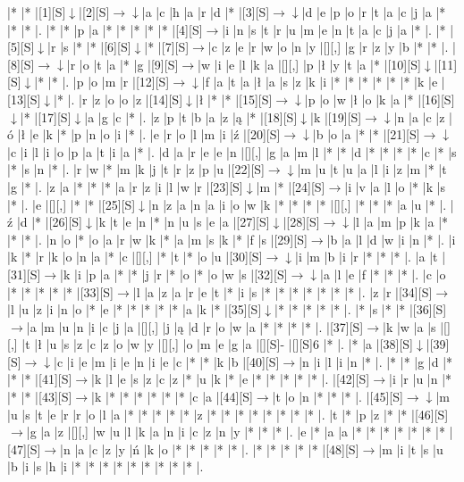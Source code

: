 \documentclass[11pt]{article}
\newcommand\drarr{$\rightarrow \!\!\!\!\! \downarrow$}
\newcommand\rarr{$\rightarrow$}
\newcommand\darr{$\downarrow$}
\begin{document}
\noindent\begin{Puzzle}{24}{26}|*	|*	|[1][S]\darr	|[2][S]\drarr	|a	|c	|h	|a	|r	|d	|*	|[3][S]\drarr	|d	|e	|p	|o	|r	|t	|a	|c	|j	|a	|*	|*	|*	|.
|*	|*	|p	|a	|*	|*	|*	|*	|*	|[4][S]\rarr	|i	|n	|s	|t	|r	|u	|m	|e	|n	|t	|a	|c	|j	|a	|*	|.
|*	|[5][S]\darr	|r	|s	|*	|*	|[6][S]\darr	|*	|[7][S]\rarr	|c	|z	|e	|r	|w	|o	|n	|y	|[][,]{ }	|g	|r	|z	|y	|b	|*	|*	|.
|[8][S]\drarr	|r	|o	|t	|a	|*	|g	|[9][S]\rarr	|w	|i	|e	|l	|k	|a	|[][,]{ }	|p	|ł	|y	|t	|a	|*	|[10][S]\darr	|[11][S]\darr	|*	|*	|.
|p	|o	|m	|r	|[12][S]\drarr	|f	|a	|t	|a	|ł	|a	|s	|z	|k	|i	|*	|*	|*	|*	|*	|*	|k	|e	|[13][S]\darr	|*	|.
|r	|z	|o	|o	|z	|[14][S]\darr	|ł	|*	|*	|[15][S]\drarr	|p	|o	|w	|ł	|o	|k	|a	|*	|[16][S]\darr	|*	|[17][S]\darr	|a	|g	|c	|*	|.
|z	|p	|t	|b	|a	|z	|ą	|*	|[18][S]\darr	|k	|[19][S]\drarr	|n	|a	|c	|z	|ó	|ł	|e	|k	|*	|p	|n	|o	|i	|*	|.
|e	|r	|o	|l	|m	|i	|ź	|[20][S]\drarr	|b	|o	|a	|*	|*	|[21][S]\drarr	|c	|i	|l	|i	|o	|p	|a	|t	|i	|a	|*	|.
|d	|a	|r	|e	|e	|n	|[][,]{ }	|g	|a	|m	|l	|*	|*	|d	|*	|*	|*	|*	|c	|*	|s	|*	|s	|n	|*	|.
|r	|w	|*	|m	|k	|j	|t	|r	|z	|p	|u	|[22][S]\drarr	|m	|u	|t	|u	|a	|l	|i	|z	|m	|*	|t	|g	|*	|.
|z	|a	|*	|*	|*	|a	|r	|z	|i	|l	|w	|r	|[23][S]\darr	|m	|*	|[24][S]\rarr	|i	|v	|a	|l	|o	|*	|k	|s	|*	|.
|e	|[][,]{ }	|*	|*	|[25][S]\darr	|n	|z	|a	|n	|a	|i	|o	|w	|k	|*	|*	|*	|*	|[][,]{ }	|*	|*	|*	|a	|u	|*	|.
|ź	|d	|*	|[26][S]\darr	|k	|t	|e	|n	|*	|n	|u	|s	|e	|a	|[27][S]\darr	|[28][S]\drarr	|l	|a	|m	|p	|k	|a	|*	|*	|*	|.
|n	|o	|*	|o	|a	|r	|w	|k	|*	|a	|m	|s	|k	|*	|f	|s	|[29][S]\rarr	|b	|a	|l	|d	|w	|i	|n	|*	|.
|i	|k	|*	|r	|k	|o	|n	|a	|*	|c	|[][,]{ }	|*	|t	|*	|o	|u	|[30][S]\drarr	|i	|m	|b	|i	|r	|*	|*	|*	|.
|a	|t	|[31][S]\rarr	|k	|i	|p	|a	|*	|*	|j	|r	|*	|o	|*	|o	|w	|s	|[32][S]\drarr	|a	|l	|e	|f	|*	|*	|*	|.
|c	|o	|*	|*	|*	|*	|*	|[33][S]\rarr	|l	|a	|z	|a	|r	|e	|t	|*	|i	|s	|*	|*	|*	|*	|*	|*	|*	|.
|z	|r	|[34][S]\rarr	|l	|u	|z	|i	|n	|o	|*	|e	|*	|*	|*	|*	|*	|a	|k	|*	|[35][S]\darr	|*	|*	|*	|*	|*	|.
|*	|s	|*	|*	|[36][S]\rarr	|a	|m	|u	|n	|i	|c	|j	|a	|[][,]{ }	|j	|ą	|d	|r	|o	|w	|a	|*	|*	|*	|*	|.
|[37][S]\rarr	|k	|w	|a	|s	|[][,]{ }	|t	|ł	|u	|s	|z	|c	|z	|o	|w	|y	|[][,]{ }	|o	|m	|e	|g	|a	|[][S]-	|[][S]6	|*	|.
|*	|a	|[38][S]\darr	|[39][S]\drarr	|c	|i	|e	|m	|i	|e	|n	|i	|e	|c	|*	|*	|k	|b	|[40][S]\rarr	|n	|i	|l	|i	|n	|*	|.
|*	|*	|g	|d	|*	|*	|*	|[41][S]\rarr	|k	|l	|e	|s	|z	|c	|z	|*	|u	|k	|*	|e	|*	|*	|*	|*	|*	|.
|[42][S]\rarr	|i	|r	|u	|n	|*	|*	|*	|[43][S]\rarr	|k	|*	|*	|*	|*	|*	|*	|c	|a	|[44][S]\rarr	|t	|o	|n	|*	|*	|*	|.
|[45][S]\drarr	|m	|u	|s	|t	|e	|r	|r	|o	|l	|a	|*	|*	|*	|*	|*	|z	|*	|*	|*	|*	|*	|*	|*	|*	|.
|t	|*	|p	|z	|*	|*	|[46][S]\rarr	|g	|a	|z	|[][,]{ }	|w	|u	|l	|k	|a	|n	|i	|c	|z	|n	|y	|*	|*	|*	|.
|e	|*	|a	|a	|*	|*	|*	|*	|*	|*	|*	|[47][S]\rarr	|n	|a	|c	|z	|y	|ń	|k	|o	|*	|*	|*	|*	|*	|.
|*	|*	|*	|*	|*	|[48][S]\rarr	|m	|i	|t	|s	|u	|b	|i	|s	|h	|i	|*	|*	|*	|*	|*	|*	|*	|*	|*	|.\end{Puzzle}
\end{document}
